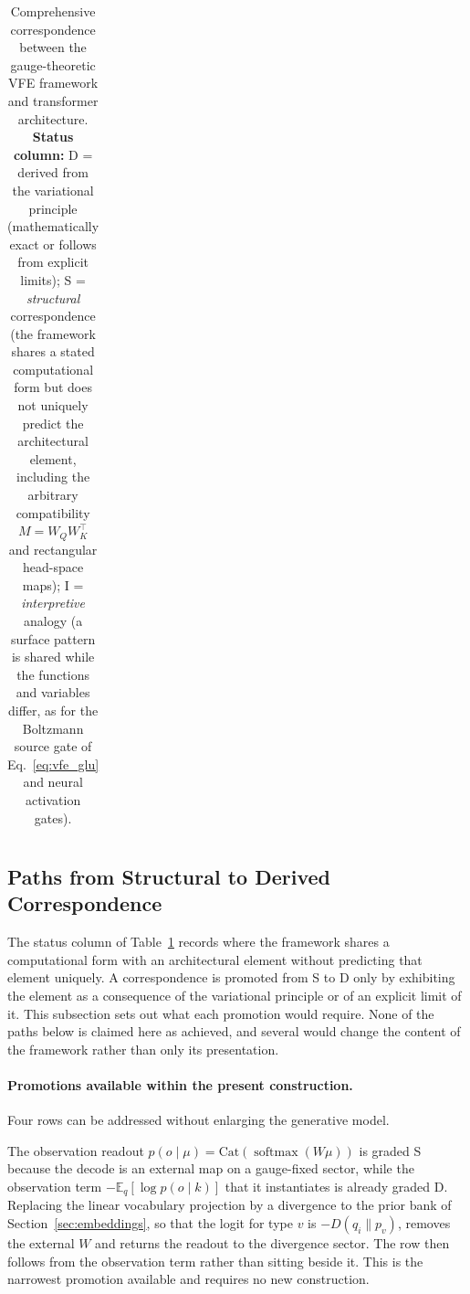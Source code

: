 \documentclass[twoside,11pt]{article}
\newcommand{\softmax}{\operatorname{softmax}}
\begin{document}
\begin{table}[p]
\begin{tabular}{|l|l|l|c|}
\hline
\end{tabular}
\caption{Comprehensive correspondence between the gauge-theoretic VFE framework and transformer architecture. \textbf{Status column:} D = derived from the variational principle (mathematically exact or follows from explicit limits); S = \emph{structural} correspondence (the framework shares a stated computational form but does not uniquely predict the architectural element, including the arbitrary compatibility $M = W_QW_K^\top$ and rectangular head-space maps); I = \emph{interpretive} analogy (a surface pattern is shared while the functions and variables differ, as for the Boltzmann source gate of Eq.~\ref{eq:vfe_glu} and neural activation gates).}
\label{tab:fep_nn_correspondence}
\end{table}


\subsection{Paths from Structural to Derived Correspondence}
\label{sec:s_to_d}

The status column of Table~\ref{tab:fep_nn_correspondence} records where the framework shares a computational form with an architectural element without predicting that element uniquely. A correspondence is promoted from S to D only by exhibiting the element as a consequence of the variational principle or of an explicit limit of it. This subsection sets out what each promotion would require. None of the paths below is claimed here as achieved, and several would change the content of the framework rather than only its presentation.

\paragraph{Promotions available within the present construction.}
Four rows can be addressed without enlarging the generative model.

The observation readout $p(o \mid \mu) = \mathrm{Cat}(\softmax(W\mu))$ is graded S because the decode is an external map on a gauge-fixed sector, while the observation term $-\mathbb{E}_q[\log p(o \mid k)]$ that it instantiates is already graded D. Replacing the linear vocabulary projection by a divergence to the prior bank of Section~\ref{sec:embeddings}, so that the logit for type $v$ is $-D(q_i \| p_v)$, removes the external $W$ and returns the readout to the divergence sector. The row then follows from the observation term rather than sitting beside it. This is the narrowest promotion available and requires no new construction.
\end{document}
